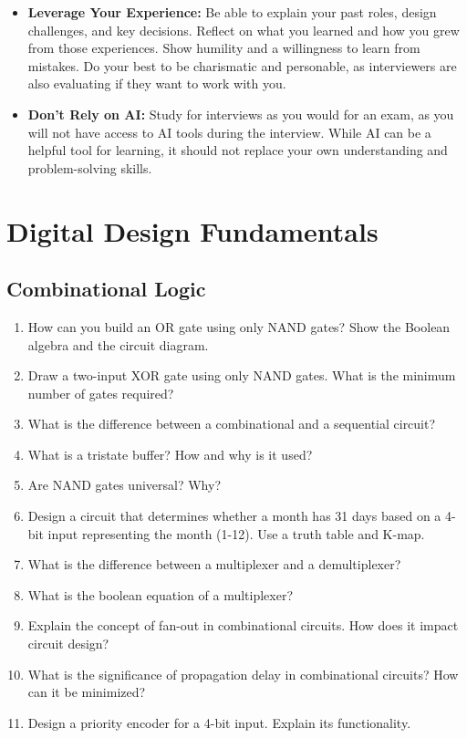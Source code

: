 \documentclass[11pt]{article}
\begin{document}
\begin{itemize}
    \item \textbf{Leverage Your Experience:} Be able to explain your past
    roles, design challenges, and key decisions. Reflect on what you learned
    and how you grew from those experiences. Show humility and a willingness to
    learn from mistakes. Do your best to be charismatic and personable, as
    interviewers are also evaluating if they want to work with you.

    \item \textbf{Don't Rely on AI:} Study for interviews as you would for an
    exam, as you will not have access to AI tools during the interview. While
    AI can be a helpful tool for learning, it should not replace your own
    understanding and problem-solving skills.
\end{itemize}

\section{Digital Design Fundamentals}

\subsection{Combinational Logic}
\begin{enumerate}
    \item How can you build an OR gate using only NAND gates? Show the Boolean
    algebra and the circuit diagram.
    \item Draw a two-input XOR gate using only NAND gates. What is the
    minimum number of gates required?
    \item What is the difference between a combinational and a sequential
    circuit?
    \item What is a tristate buffer? How and why is it used?
    \item Are NAND gates universal? Why?
    \item Design a circuit that determines whether a month has 31 days based on
    a 4-bit input representing the month (1-12). Use a truth table and K-map.
    \item What is the difference between a multiplexer and a demultiplexer?
    \item What is the boolean equation of a multiplexer?
    \item Explain the concept of fan-out in combinational circuits. How does it
    impact circuit design?
    \item What is the significance of propagation delay in combinational
    circuits? How can it be minimized?
    \item Design a priority encoder for a 4-bit input. Explain its functionality.
\end{enumerate}
\end{document}
